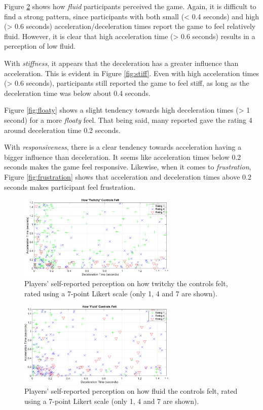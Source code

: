 Figure \ref{fig:fluid} shows how \textit{fluid} participants perceived the game. Again, it is difficult to find a strong pattern, since participants with both small (< 0.4 seconds) and high (> 0.6 seconds) acceleration/deceleration times report the game to feel relatively fluid. However, it is clear that high acceleration time (> 0.6 seconds) results in a perception of low fluid.

With \textit{stiffness}, it appears that the deceleration has a greater influence than acceleration. This is evident in Figure \ref{fig:stiff}. Even with high acceleration times (> 0.6 seconds), participants still reported the game to feel stiff, as long as the deceleration time was below about 0.4 seconds.

Figure \ref{fig:floaty} shows a slight tendency towards high deceleration times (> 1 second) for a more \textit{floaty} feel. That being said, many reported gave the rating 4 around deceleration time 0.2 seconds.

With \textit{responsiveness}, there is a clear tendency towards acceleration having a bigger influence than deceleration. It seems like acceleration times below 0.2 seconds makes the game feel responsive. Likewise, when it comes to \textit{frustration}, Figure \ref{fig:frustration} shows that acceleration and deceleration times above 0.2 seconds makes participant feel frustration.

\begin{figure}[htbp]
\centering
\includegraphics[width=0.67\textwidth]{Pics/Classes/Twitchy_classes}
\caption{Players' self-reported perception on how twitchy the controls felt, rated using a 7-point Likert scale (only 1, 4 and 7 are shown).}
\label{fig:twitchy}
\end{figure}

\begin{figure}[htbp]
\centering
\includegraphics[width=0.67\textwidth]{Pics/Classes/Fluid_classes}
\caption{Players' self-reported perception on how fluid the controls felt, rated using a 7-point Likert scale (only 1, 4 and 7 are shown).}
\label{fig:fluid}
\end{figure}

